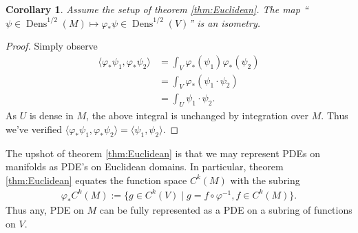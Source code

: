 \documentclass[letterpaper, 12 pt]{amsart}
\newcommand{\R}{\mathbb{R}}
\newtheorem{thm}{Theorem}[section]
\newtheorem{cor}[thm]{Corollary}
\DeclareMathOperator{\Dens}{Dens}
\begin{document}
  \begin{cor}
    Assume the setup of theorem \ref{thm:Euclidean}.
    The map 
    ``$\psi \in \Dens^{1/2}(M) \mapsto \varphi_* \psi \in \Dens^{1/2}(V)$''
    is an isometry.
  \end{cor}
  \begin{proof}
    Simply observe
    \begin{align*}
      \langle \varphi_*\psi_1 , \varphi_*\psi_2 \rangle
      &= \int_V \varphi_*(\psi_1) \varphi_*(\psi_2) \\
      &= \int_V \varphi_*( \psi_1 \cdot \psi_2) \\
      &= \int_U \psi_1 \cdot \psi_2.
    \end{align*}
    As $U$ is dense in $M$, the above integral is unchanged by integration
    over $M$.   Thus we've verified $\langle \varphi_* \psi_1,\varphi_*\psi_2 \rangle = \langle \psi_1,\psi_2 \rangle$.
  \end{proof}

  The upshot of theorem \ref{thm:Euclidean} is that we may represent PDEs on manifolds
  as PDE's on Euclidean domains.
  In particular, theorem \ref{thm:Euclidean} equates the function
  space $C^k(M)$ with the subring
  \begin{align*}
    \varphi_*C^k(M) := \{ g \in C^k(V) \mid g = f \circ \varphi^{-1} , f \in C^k(M) \}.
  \end{align*}
  Thus any, PDE on $M$ can be fully represented as a PDE on a 
  subring of functions on $V$.
  


  
\end{document}
